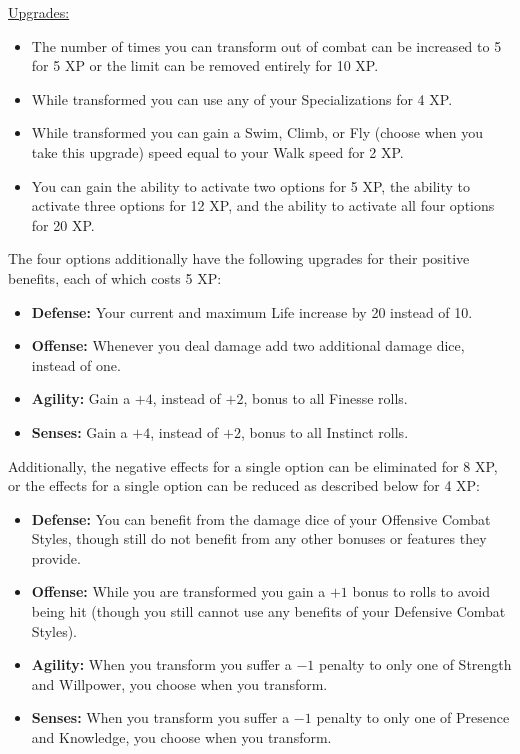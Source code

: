 %
\underline{Upgrades:}
\begin{itemize}
  \item[-] The number of times you can transform out of combat can be increased to 5 for 5 XP or the limit can be removed entirely for 10 XP.
  \item[-] While transformed you can use any of your Specializations for 4 XP.
  \item[-] While transformed you can gain a Swim, Climb, or Fly (choose when you take this upgrade) speed equal to your Walk speed for 2 XP.
  \item[-] You can gain the ability to activate two options for 5 XP, the ability to activate three options for 12 XP, and the ability to activate all four options for 20 XP.
\end{itemize}
The four options additionally have the following upgrades for their positive benefits, each of which costs 5 XP:
\begin{itemize}
  \item \textbf{Defense:} Your current and maximum Life increase by 20 instead of 10.
  \item \textbf{Offense:} Whenever you deal damage add two additional damage dice, instead of one.
  \item \textbf{Agility:} Gain a $+4$, instead of $+2$, bonus to all Finesse rolls.
  \item \textbf{Senses:} Gain a $+4$, instead of $+2$, bonus to all Instinct rolls.
\end{itemize}
Additionally, the negative effects for a single option can be eliminated for 8 XP, or the effects for a single option can be reduced as described below for 4 XP:
\begin{itemize}
  \item \textbf{Defense:} You can benefit from the damage dice of your Offensive Combat Styles, though still do not benefit from any other bonuses or features they provide.
  \item \textbf{Offense:} While you are transformed you gain a $+1$ bonus to rolls to avoid being hit (though you still cannot use any benefits of your Defensive Combat Styles).
  \item \textbf{Agility:} When you transform you suffer a $-1$ penalty to only one of Strength and Willpower, you choose when you transform.
  \item \textbf{Senses:} When you transform you suffer a $-1$ penalty to only one of Presence and Knowledge, you choose when you transform.
\end{itemize}

